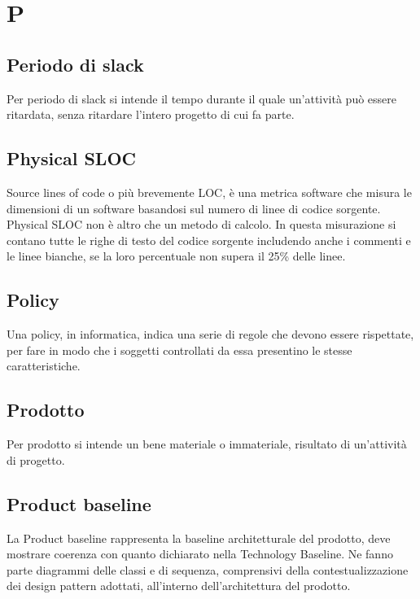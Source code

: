 \section{P}

    \subsection*{Periodo di slack}

        Per periodo di slack si intende il tempo durante il quale un'attività può essere ritardata,
        senza ritardare l'intero progetto di cui fa parte.

    \subsection*{Physical SLOC}

        Source lines of code o più brevemente LOC, è una metrica software che misura le dimensioni di un software
        basandosi sul numero di linee di codice sorgente. Physical SLOC non è altro che un metodo di calcolo.
        In questa misurazione si contano tutte le righe di testo del codice sorgente includendo anche i commenti e le
        linee bianche, se la loro percentuale non supera il 25\% delle linee.

	\subsection*{Policy}

	    Una policy, in informatica, indica una serie di regole che devono essere rispettate, per fare in modo che i
	    soggetti controllati da essa presentino le stesse caratteristiche.

    \subsection*{Prodotto}

        Per prodotto si intende un bene materiale o immateriale, risultato di un'attività di progetto.

    \subsection*{Product baseline}

        La Product baseline rappresenta la baseline architetturale del prodotto, deve mostrare coerenza con quanto
        dichiarato nella Technology Baseline.
        Ne fanno parte diagrammi delle classi e di sequenza, comprensivi della contestualizzazione dei design
        pattern adottati, all'interno dell'architettura del prodotto.

